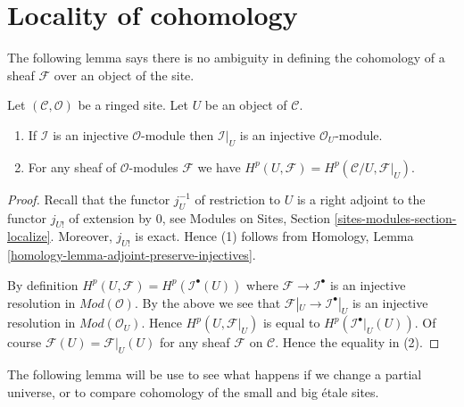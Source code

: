 








\section{Locality of cohomology}
\label{section-locality}

\noindent
The following lemma says there is no ambiguity in defining the cohomology
of a sheaf $\mathcal{F}$ over an object of the site.

\begin{lemma}
\label{lemma-cohomology-of-open}
Let $(\mathcal{C}, \mathcal{O})$ be a ringed site.
Let $U$ be an object of $\mathcal{C}$.
\begin{enumerate}
\item If $\mathcal{I}$ is an injective $\mathcal{O}$-module
then $\mathcal{I}|_U$ is an injective $\mathcal{O}_U$-module.
\item For any sheaf of $\mathcal{O}$-modules $\mathcal{F}$ we have
$H^p(U, \mathcal{F}) = H^p(\mathcal{C}/U, \mathcal{F}|_U)$.
\end{enumerate}
\end{lemma}

\begin{proof}
Recall that the functor $j_U^{-1}$ of restriction to $U$ is a right adjoint
to the functor $j_{U!}$ of extension by $0$, see
Modules on Sites, Section
\ref{sites-modules-section-localize}.
Moreover, $j_{U!}$ is exact. Hence (1) follows from
Homology, Lemma \ref{homology-lemma-adjoint-preserve-injectives}.

\medskip\noindent
By definition $H^p(U, \mathcal{F}) = H^p(\mathcal{I}^\bullet(U))$
where $\mathcal{F} \to \mathcal{I}^\bullet$ is an injective resolution
in $\textit{Mod}(\mathcal{O})$.
By the above we see that $\mathcal{F}|_U \to \mathcal{I}^\bullet|_U$
is an injective resolution in $\textit{Mod}(\mathcal{O}_U)$.
Hence $H^p(U, \mathcal{F}|_U)$ is equal to
$H^p(\mathcal{I}^\bullet|_U(U))$.
Of course $\mathcal{F}(U) = \mathcal{F}|_U(U)$ for
any sheaf $\mathcal{F}$ on $\mathcal{C}$.
Hence the equality in (2).
\end{proof}

\noindent
The following lemma will be use to see what happens if we change a
partial universe, or to compare cohomology of the small and big \'etale
sites.

